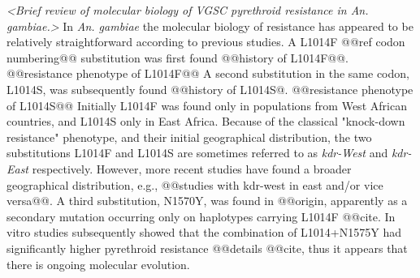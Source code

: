 \documentclass[a4paper,11pt,abstracton,hidelinks]{scrartcl}
\begin{document}
\textit{<Brief review of molecular biology of VGSC pyrethroid resistance in An. gambiae.>}
%
In \textit{An. gambiae} the molecular biology of resistance has appeared to be relatively straightforward according to previous studies.
%
A L1014F @@ref codon numbering@@ substitution was first found @@history of L1014F@@.
%
@@resistance phenotype of L1014F@@
%
A second substitution in the same codon, L1014S, was subsequently found @@history of L1014S@.
%
@@resistance phenotype of L1014S@@
%
Initially L1014F was found only in populations from West African countries, and L1014S only in East Africa.
%
Because of the classical "knock-down resistance" phenotype, and their initial geographical distribution, the two substitutions L1014F and L1014S are sometimes referred to as \textit{kdr-West} and \textit{kdr-East} respectively.
%
However, more recent studies have found a broader geographical distribution, e.g., @@studies with kdr-west in east and/or vice versa@@.
%
A third substitution, N1570Y, was found in @@origin, apparently as a secondary mutation occurring only on haplotypes carrying L1014F @@cite.
%
In vitro studies subsequently showed that the combination of L1014+N1575Y had significantly higher pyrethroid resistance @@details @@cite, thus it appears that there is ongoing molecular evolution.
\end{document}
